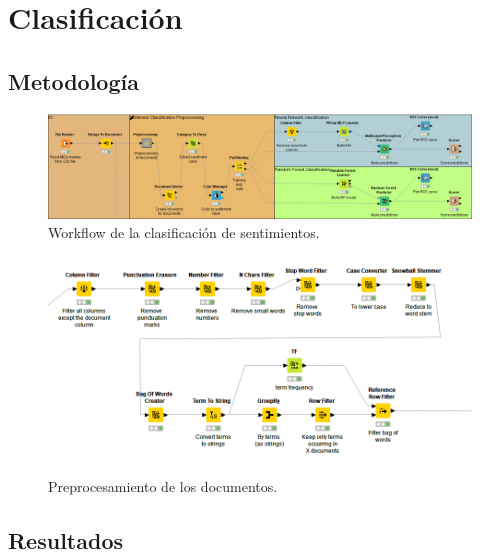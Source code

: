 \section{Clasificación}

\subsection{Metodología}

\begin{figure}[t]
    \center\includegraphics[width=.95\linewidth]{img/classification/workflow.png}
    \caption{Workflow de la clasificación de sentimientos.}
\end{figure}

\begin{figure}[t]
    \center\includegraphics[width=.95\linewidth]{img/classification/preprocessing.png}
    \caption{Preprocesamiento de los documentos.}
\end{figure}


\subsection{Resultados}

